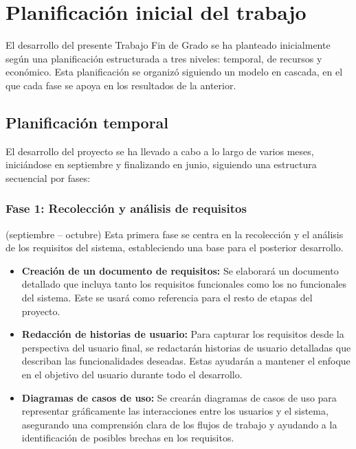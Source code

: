 \section{Planificación inicial del trabajo}

El desarrollo del presente Trabajo Fin de Grado se ha planteado inicialmente según una planificación estructurada a tres niveles: temporal, de recursos y económico. Esta planificación se organizó siguiendo un modelo en cascada, en el que cada fase se apoya en los resultados de la anterior.

\subsection{Planificación temporal}

El desarrollo del proyecto se ha llevado a cabo a lo largo de varios meses, iniciándose en septiembre y finalizando en junio, siguiendo una estructura secuencial por fases:

\subsubsection{Fase 1: Recolección y análisis de requisitos} (septiembre – octubre)
Esta primera fase se centra en la recolección y el análisis de los requisitos del sistema, estableciendo una base para el posterior desarrollo. 
\begin{itemize}
    \item \textbf{Creación de un documento de requisitos:} Se elaborará un documento detallado que incluya tanto los requisitos funcionales como los no funcionales del sistema. Este se usará como referencia para el resto de etapas del proyecto. 
    \item \textbf{Redacción de historias de usuario:} Para capturar los requisitos desde la perspectiva del usuario final, se redactarán historias de usuario detalladas que describan las funcionalidades deseadas. Estas ayudarán a mantener el enfoque en el objetivo del usuario durante todo el desarrollo.
    \item \textbf{Diagramas de casos de uso:} Se crearán diagramas de casos de uso para representar gráficamente las interacciones entre los usuarios y el sistema, asegurando una comprensión clara de los flujos de trabajo y ayudando a la identificación de posibles brechas en los requisitos.
\end{itemize}

